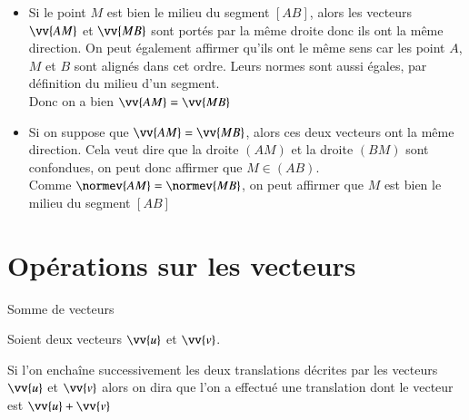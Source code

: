 \documentclass[oneside,12pt]{article}          %
\begin{document}
\begin{demonstration}\vspace{-15pt}
	\begin{itemize}[label = $\bullet$]
		\item Si le point $M$ est bien le milieu du segment $[AB]$, alors les vecteurs $\vv{AM}$ et $\vv{MB}$ sont portés par la même droite donc ils ont la même direction. On peut également affirmer qu'ils ont le même sens car les point $A$, $M$ et $B$ sont alignés dans cet ordre. Leurs normes sont aussi égales, par définition du milieu d'un segment.\\
		Donc on a bien $\vv{AM} = \vv{MB}$
		\item Si on suppose que $\vv{AM} = \vv{MB}$, alors ces deux vecteurs ont la même direction. Cela veut dire que la droite $(AM)$ et la droite $(BM)$ sont confondues, on peut donc affirmer que $M \in (AB)$. \\
		Comme $\normev{AM} = \normev{MB}$, on peut affirmer que $M$ est bien le milieu du segment $[AB]$
	\end{itemize}
\end{demonstration}





\section{Opérations sur les vecteurs}

\begin{definition}{Somme de vecteurs}
\begin{minipage}{0.5\linewidth}
    Soient deux vecteurs $\vv{u}$ et $\vv{v}$.
    
    Si l'on enchaîne successivement les deux translations décrites par les vecteurs $\vv{u}$ et $\vv{v}$ alors on dira que l'on a effectué une translation dont le vecteur est $\vv{u}+\vv{v}$
\end{minipage} \hspace{5mm}
\begin{minipage}{0.45\linewidth}
\end{minipage}
\end{definition}
\end{document}
